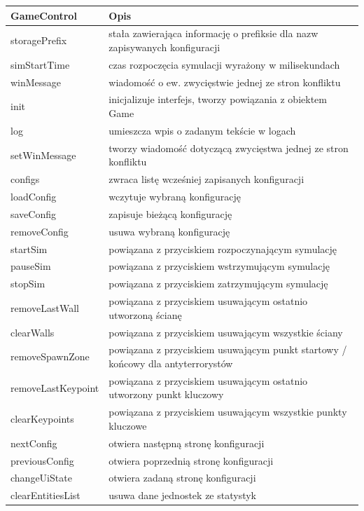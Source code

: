 \begin{table}
\begin{center}
\begin{tabular}{|p{}|p{}|}
\hline
\textbf{GameControl} & Opis\\\hline		
	storagePrefix & stała zawierająca informację o prefiksie dla nazw zapisywanych konfiguracji\\
	simStartTime & czas rozpoczęcia symulacji wyrażony w milisekundach\\
	winMessage & wiadomość o ew. zwycięstwie jednej ze stron konfliktu
\\\hline
	init & inicjalizuje interfejs, tworzy powiązania z obiektem Game\\
	log & umieszcza wpis o zadanym tekście w logach\\
	setWinMessage & tworzy wiadomość dotyczącą zwycięstwa jednej ze stron konfliktu\\
	configs & zwraca listę wcześniej zapisanych konfiguracji\\
	loadConfig & wczytuje wybraną konfigurację\\
	saveConfig & zapisuje bieżącą konfigurację\\
	removeConfig & usuwa wybraną konfigurację\\
	startSim & powiązana z przyciskiem rozpoczynającym symulację \\
	pauseSim & powiązana z przyciskiem wstrzymującym symulację\\ 
	stopSim & powiązana z przyciskiem zatrzymującym symulację\\ 
	removeLastWall & powiązana z przyciskiem usuwającym ostatnio utworzoną ścianę\\
	clearWalls & powiązana z przyciskiem usuwającym wszystkie ściany\\
	removeSpawnZone & powiązana z przyciskiem usuwającym punkt startowy / końcowy dla antyterrorystów\\
	removeLastKeypoint & powiązana z przyciskiem usuwającym ostatnio utworzony punkt kluczowy\\
	clearKeypoints & powiązana z przyciskiem usuwającym wszystkie punkty kluczowe\\
	nextConfig & otwiera następną stronę konfiguracji\\
	previousConfig & otwiera poprzednią stronę konfiguracji\\
	changeUiState & otwiera zadaną stronę konfiguracji\\
	clearEntitiesList & usuwa dane jednostek ze statystyk\\

\end{tabular}
\end{center}
\end{table}
